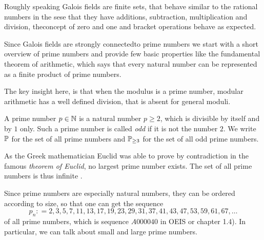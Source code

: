 Roughly speaking Galois fields are finite sets, that behave similar to the rational numbers in the sese that they have additions, subtraction, multiplication and division, theconcept of zero and one and bracket operations behave as expected.

Since Galois fields are strongly connectedto prime numbers we start with
a short overview of prime numbers and provide few basic properties like the fundamental theorem of arithmetic, which says that every natural number can be represented as a finite product of prime numbers.

The key insight here, is that when the modulus is a prime number, modular arithmetic has a well defined division, that is absent for general moduli.

A prime number $ p \in \mathbb{N} $ is a natural number $ p \geq 2 $, which is divisible by itself and by $ 1 $ only. Such a prime number is called \textit{odd} if it is not the number $ 2 $. We write $ \mathbb{P} $ for the set of all prime numbers and $ \mathbb{P} _{\geq 3} $ for the set of all odd prime numbers.

As the Greek mathematician Euclid was able to prove by contradiction in the famous \textit{theorem of Euclid}, no largest prime number exists. The set of all prime numbers is thus infinite \cite{AL}.

Since prime numbers are especially natural numbers, they can be ordered according to size, so that one can get the sequence
\begin{equation}
\label{eq: primenumber_sequence}
p_n: = 2, 3, 5, 7, 11, 13, 17, 19, 23, 29, 31, 37, 41, 43, 47, 53, 59, 61, 67, \ldots
\end{equation}
of all prime numbers, which is sequence $ A000040 $ in OEIS or \cite{HW} chapter 1.4). In particular, we can talk about small and large prime numbers.


